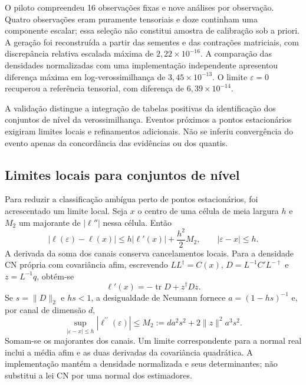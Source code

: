 O piloto compreendeu 16 observações fixas e nove análises por observação. Quatro observações eram puramente tensoriais e doze continham uma componente escalar; essa seleção não constitui amostra de calibração sob a priori. A geração foi reconstruída a partir das sementes e das contrações matriciais, com discrepância relativa escalada máxima de $2{,}22\times10^{-16}$. A comparação das densidades normalizadas com uma implementação independente apresentou diferença máxima em log-verossimilhança de $3{,}45\times10^{-13}$. O limite $\varepsilon=0$ recuperou a referência tensorial, com diferença de $6{,}39\times10^{-14}$.

A validação distingue a integração de tabelas positivas da identificação dos conjuntos de nível da verossimilhança. Eventos próximos a pontos estacionários exigiram limites locais e refinamentos adicionais. Não se inferiu convergência do evento apenas da concordância das evidências ou dos quantis.

\subsection{Limites locais para conjuntos de nível}

Para reduzir a classificação ambígua perto de pontos estacionários, foi acrescentado um limite local. Seja $x$ o centro de uma célula de meia largura $h$ e $M_2$ um majorante de $|\ell''|$ nessa célula. Então
\begin{equation}
 |\ell(\varepsilon)-\ell(x)|\leq h|\ell'(x)|+\frac{h^2}{2}M_2,
 \qquad |\varepsilon-x|\leq h.
\end{equation}
A derivada da soma dos canais conserva cancelamentos locais. Para a densidade CN própria com covariância afim, escrevendo $LL^\dagger=C(x)$, $D=L^{-1}C'L^{-\dagger}$ e $z=L^{-1}q$, obtém-se
\begin{equation}
 \ell'(x)=-\operatorname{tr}D+z^\dagger Dz.
\end{equation}
Se $s=\|D\|_2$ e $hs<1$, a desigualdade de Neumann fornece $a=(1-hs)^{-1}$ e, por canal de dimensão $d$,
\begin{equation}
 \sup_{|\varepsilon-x|\leq h}|\ell^{\prime\prime}(\varepsilon)|\leq M_2 := d a^2s^2+2\|z\|^2a^3s^2.
\end{equation}
Somam-se os majorantes dos canais. Um limite correspondente para a normal real inclui a média afim e as duas derivadas da covariância quadrática. A implementação mantém a densidade normalizada e seus determinantes; não substitui a lei CN por uma normal dos estimadores.

